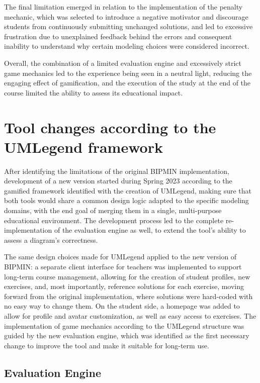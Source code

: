 The final limitation emerged in relation to the implementation of the penalty mechanic, which was selected to introduce a negative motivator and discourage students from continuously submitting unchanged solutions, and led to excessive frustration due to unexplained feedback behind the errors and consequent inability to understand why certain modeling choices were considered incorrect. 

Overall, the combination of a limited evaluation engine and excessively strict game mechanics led to the experience being seen in a neutral light, reducing the engaging effect of gamification, and the execution of the study at the end of the course limited the ability to assess its educational impact. 

\section{Tool changes according to the UMLegend framework}

After identifying the limitations of the original BIPMIN implementation, development of a new version started during Spring 2023 according to the gamified framework identified with the creation of UMLegend, making sure that both tools would share a common design logic adapted to the specific modeling domains, with the end goal of merging them in a single, multi-purpose educational environment. The development process led to the complete re-implementation of the evaluation engine as well, to extend the tool's ability to assess a diagram's correctness.

The same design choices made for UMLegend applied to the new version of BIPMIN: a separate client interface for teachers was implemented to support long-term course management, allowing for the creation of student profiles, new exercises, and, most importantly, reference solutions for each exercise, moving forward from the original implementation, where solutions were hard-coded with no easy way to change them. On the student side, a homepage was added to allow for profile and avatar customization, as well as easy access to exercises. The implementation of game mechanics according to the UMLegend structure was guided by the new evaluation engine, which was identified as the first necessary change to improve the tool and make it suitable for long-term use.

\subsection{Evaluation Engine}

